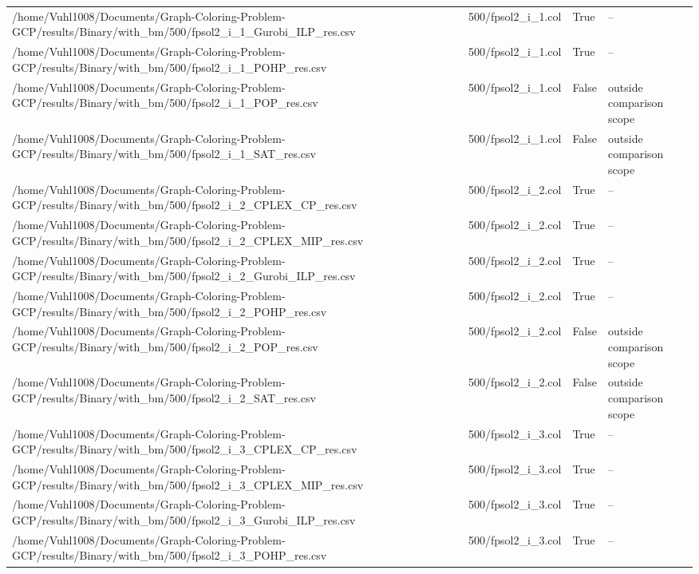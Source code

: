 \begin{table}[htbp]
\begin{tabular}{llll}
/home/Vuhl1008/Documents/Graph-Coloring-Problem-GCP/results/Binary/with\_bm/500/fpsol2\_i\_1\_Gurobi\_ILP\_res.csv & 500/fpsol2\_i\_1.col & True & -- \\
/home/Vuhl1008/Documents/Graph-Coloring-Problem-GCP/results/Binary/with\_bm/500/fpsol2\_i\_1\_POHP\_res.csv & 500/fpsol2\_i\_1.col & True & -- \\
/home/Vuhl1008/Documents/Graph-Coloring-Problem-GCP/results/Binary/with\_bm/500/fpsol2\_i\_1\_POP\_res.csv & 500/fpsol2\_i\_1.col & False & outside comparison scope \\
/home/Vuhl1008/Documents/Graph-Coloring-Problem-GCP/results/Binary/with\_bm/500/fpsol2\_i\_1\_SAT\_res.csv & 500/fpsol2\_i\_1.col & False & outside comparison scope \\
/home/Vuhl1008/Documents/Graph-Coloring-Problem-GCP/results/Binary/with\_bm/500/fpsol2\_i\_2\_CPLEX\_CP\_res.csv & 500/fpsol2\_i\_2.col & True & -- \\
/home/Vuhl1008/Documents/Graph-Coloring-Problem-GCP/results/Binary/with\_bm/500/fpsol2\_i\_2\_CPLEX\_MIP\_res.csv & 500/fpsol2\_i\_2.col & True & -- \\
/home/Vuhl1008/Documents/Graph-Coloring-Problem-GCP/results/Binary/with\_bm/500/fpsol2\_i\_2\_Gurobi\_ILP\_res.csv & 500/fpsol2\_i\_2.col & True & -- \\
/home/Vuhl1008/Documents/Graph-Coloring-Problem-GCP/results/Binary/with\_bm/500/fpsol2\_i\_2\_POHP\_res.csv & 500/fpsol2\_i\_2.col & True & -- \\
/home/Vuhl1008/Documents/Graph-Coloring-Problem-GCP/results/Binary/with\_bm/500/fpsol2\_i\_2\_POP\_res.csv & 500/fpsol2\_i\_2.col & False & outside comparison scope \\
/home/Vuhl1008/Documents/Graph-Coloring-Problem-GCP/results/Binary/with\_bm/500/fpsol2\_i\_2\_SAT\_res.csv & 500/fpsol2\_i\_2.col & False & outside comparison scope \\
/home/Vuhl1008/Documents/Graph-Coloring-Problem-GCP/results/Binary/with\_bm/500/fpsol2\_i\_3\_CPLEX\_CP\_res.csv & 500/fpsol2\_i\_3.col & True & -- \\
/home/Vuhl1008/Documents/Graph-Coloring-Problem-GCP/results/Binary/with\_bm/500/fpsol2\_i\_3\_CPLEX\_MIP\_res.csv & 500/fpsol2\_i\_3.col & True & -- \\
/home/Vuhl1008/Documents/Graph-Coloring-Problem-GCP/results/Binary/with\_bm/500/fpsol2\_i\_3\_Gurobi\_ILP\_res.csv & 500/fpsol2\_i\_3.col & True & -- \\
/home/Vuhl1008/Documents/Graph-Coloring-Problem-GCP/results/Binary/with\_bm/500/fpsol2\_i\_3\_POHP\_res.csv & 500/fpsol2\_i\_3.col & True & -- \\

\end{tabular}
\end{table}
